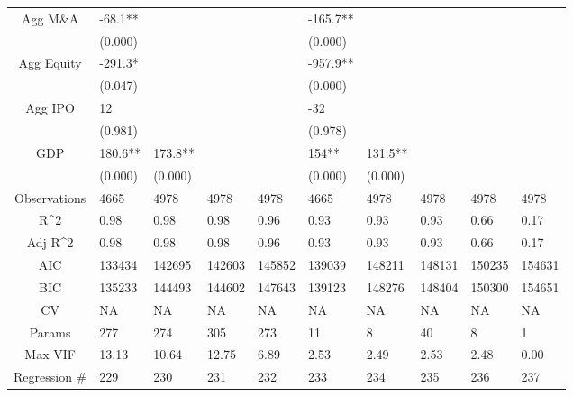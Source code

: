 \documentclass{article}
\begin{document}
\begin{table}[H]
\begin{tabular}{|clllllllll|}
  Agg M\&A & -68.1** &  &  &  & -165.7** &  &  &  &  \\ 
   & (0.000) &  &  &  & (0.000) &  &  &  &  \\ 
  Agg Equity & -291.3* &  &  &  & -957.9** &  &  &  &  \\ 
   & (0.047) &  &  &  & (0.000) &  &  &  &  \\ 
  Agg IPO & 12 &  &  &  & -32 &  &  &  &  \\ 
   & (0.981) &  &  &  & (0.978) &  &  &  &  \\ 
  GDP & 180.6** & 173.8** &  &  & 154** & 131.5** &  &  &  \\ 
   & (0.000) & (0.000) &  &  & (0.000) & (0.000) &  &  &  \\ 
  \hline 
 Observations & 4665 & 4978 & 4978 & 4978 & 4665 & 4978 & 4978 & 4978 & 4978 \\ 
  R^2 & 0.98 & 0.98 & 0.98 & 0.96 & 0.93 & 0.93 & 0.93 & 0.66 & 0.17 \\ 
  Adj R^2 & 0.98 & 0.98 & 0.98 & 0.96 & 0.93 & 0.93 & 0.93 & 0.66 & 0.17 \\ 
  AIC & 133434 & 142695 & 142603 & 145852 & 139039 & 148211 & 148131 & 150235 & 154631 \\ 
  BIC & 135233 & 144493 & 144602 & 147643 & 139123 & 148276 & 148404 & 150300 & 154651 \\ 
  CV & NA & NA & NA & NA & NA & NA & NA & NA & NA \\ 
  Params & 277 & 274 & 305 & 273 & 11 & 8 & 40 & 8 & 1 \\ 
  Max VIF & 13.13 & 10.64 & 12.75 & 6.89 & 2.53 & 2.49 & 2.53 & 2.48 & 0.00 \\ 
  Regression \# & 229 & 230 & 231 & 232 & 233 & 234 & 235 & 236 & 237 \\ 
   \hline
\end{tabular}
 
\end{table}
\end{document}
